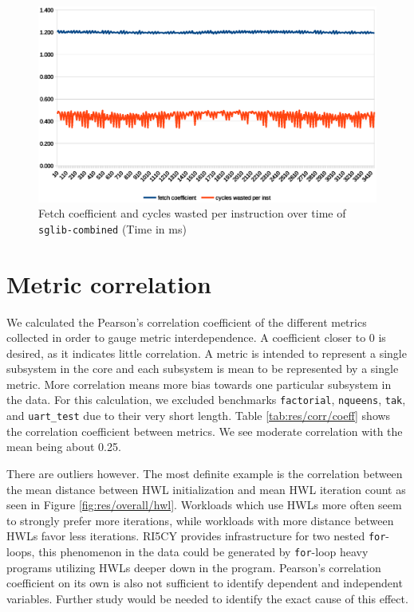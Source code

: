 \documentclass[../bachelor_paper.tex]{subfiles}
\begin{document}
\begin{figure}
    \centering
    \includegraphics[width=\textwidth]{img/graph/embench/sglib-combined_fetch_waste.eps}
    \caption{Fetch coefficient and cycles wasted per instruction over time of \texttt{sglib-combined} (Time in ms)}
    \label{fig:res/sglib/fetch_waste}
\end{figure}

\section{Metric correlation}
    \label{sec:res/corr}
We calculated the Pearson's correlation coefficient of the different metrics collected in order to gauge metric interdependence. A coefficient closer to 0 is desired, as it indicates little correlation. A metric is intended to represent a single subsystem in the core and each subsystem is mean to be represented by a single metric. More correlation means more bias towards one particular subsystem in the data. For this calculation, we excluded benchmarks \texttt{factorial}, \texttt{nqueens}, \texttt{tak}, and \texttt{uart\_test} due to their very short length. Table \ref{tab:res/corr/coeff} shows the correlation coefficient between metrics. We see moderate correlation with the mean being about 0.25. 

There are outliers however. The most definite example is the correlation between the mean distance between \ac{HWL} initialization and mean \ac{HWL} iteration count as seen in Figure \ref{fig:res/overall/hwl}. Workloads which use \acp{HWL} more often seem to strongly prefer more iterations, while workloads with more distance between \acp{HWL} favor less iterations. RI5CY provides infrastructure for two nested \texttt{for}-loops, this phenomenon in the data could be generated by \texttt{for}-loop heavy programs utilizing \acp{HWL} deeper down in the program. Pearson's correlation coefficient on its own is also not sufficient to identify dependent and independent variables. Further study would be needed to identify the exact cause of this effect. 
\end{document}
